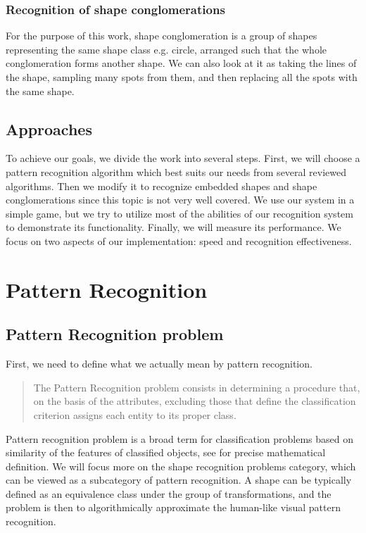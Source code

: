 \subsection{Recognition of shape conglomerations}
For the purpose of this work, shape conglomeration is a group of shapes representing the same shape class e.g. circle, arranged such that the whole conglomeration forms another shape. We can also look at it as taking the lines of the shape, sampling many spots from them, and then replacing all the spots with the same shape.

\section{Approaches}

To achieve our goals, we divide the work into several steps. First, we will choose a pattern recognition algorithm which best suits our needs from several reviewed algorithms. Then we modify it to recognize embedded shapes and shape conglomerations since this topic is not very well covered. We use our system in a simple game, but we try to utilize most of the abilities of our recognition system to demonstrate its functionality. Finally, we will measure its performance. We focus on two aspects of our implementation: speed and recognition effectiveness.

\chapter{Pattern Recognition}

\section{Pattern Recognition problem}
First, we need to define what we actually mean by pattern recognition. \begin{quotation}
The Pattern Recognition problem consists in determining a procedure that, on the basis of the attributes, excluding those that define the classification criterion assigns each entity to its proper class.
\end{quotation} \cite{formalMethods}
 Pattern recognition problem is a broad term for classification problems based on similarity of the features of classified objects, see \cite{formatMethods} for precise mathematical definition. We will focus more on the shape recognition problems category, which can be viewed as a subcategory of pattern recognition. A shape can be typically defined as an equivalence class under the group of transformations, and the problem is then to algorithmically approximate the human-like visual pattern recognition. 

